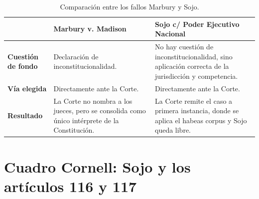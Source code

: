 \documentclass[12pt,oneside,a4paper]{book}
\begin{document}
\begin{table}[H]
\centering
\begin{tabularx}{\textwidth}{
    >{\raggedright\arraybackslash}p{}
    >{\raggedright\arraybackslash}X
    >{\raggedright\arraybackslash}X
}
\toprule
& \textbf{Marbury v. Madison} & \textbf{Sojo c/ Poder Ejecutivo Nacional} \\
\midrule
\textbf{Cuestión de fondo} & Declaración de inconstitucionalidad. & No hay cuestión de inconstitucionalidad, sino aplicación correcta de la jurisdicción y competencia. \\
\addlinespace
\textbf{Vía elegida} & Directamente ante la Corte. & Directamente ante la Corte. \\
\addlinespace
\textbf{Resultado} & La Corte no nombra a los jueces, pero se consolida como único intérprete de la Constitución. & La Corte remite el caso a primera instancia, donde se aplica el habeas corpus y Sojo queda libre. \\
\bottomrule
\end{tabularx}
\caption{Comparación entre los fallos Marbury y Sojo.}
\end{table}

\section{Cuadro Cornell: Sojo y los artículos 116 y 117}
\end{document}
